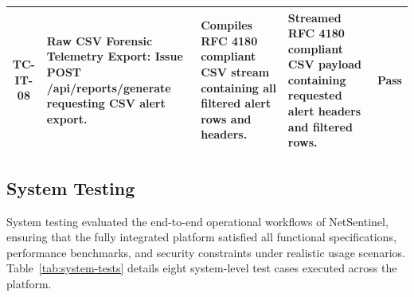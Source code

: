 \documentclass[a4paper,12pt]{report}
\begin{document}
\begin{table}[H]
{\begin{tabular}{|c|p{4.6cm}|p{4.6cm}|p{4.6cm}|c|}
				TC-IT-08 & Raw CSV Forensic Telemetry Export: Issue POST /api/reports/generate requesting CSV alert export. & Compiles RFC 4180 compliant CSV stream containing all filtered alert rows and headers. & Streamed RFC 4180 compliant CSV payload containing requested alert headers and filtered rows. & Pass \\ \hline
			\end{tabular}
		}
	\end{table}
	
	\subsection{System Testing}
	\par
	System testing evaluated the end-to-end operational workflows of NetSentinel, ensuring that the fully integrated platform satisfied all functional specifications, performance benchmarks, and security constraints under realistic usage scenarios. Table~\ref{tab:system-tests} details eight system-level test cases executed across the platform.
	
\end{document}
